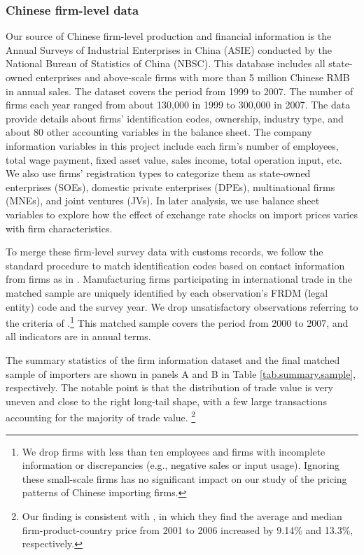 \subsubsection{Chinese firm-level data} \label{Data-CIE}

Our source of Chinese firm-level production and financial information is the Annual Surveys of Industrial Enterprises in China (ASIE) conducted by the National Bureau of Statistics of China (NBSC). This database includes all state-owned enterprises and above-scale firms with more than 5 million Chinese RMB in annual sales. The dataset covers the period from 1999 to 2007. The number of firms each year ranged from about 130,000 in 1999 to 300,000 in 2007. The data provide details about firms’ identification codes, ownership, industry type, and about 80 other accounting variables in the balance sheet. The company information variables in this project include each firm's number of employees, total wage payment, fixed asset value, sales income, total operation input, etc. We also use firms’ registration types to categorize them as state-owned enterprises (SOEs), domestic private enterprises (DPEs), multinational firms (MNEs), and joint ventures (JVs). In later analysis, we use balance sheet variables to explore how the effect of exchange rate shocks on import prices varies with firm characteristics.

To merge these firm-level survey data with customs records, we follow the standard procedure to match identification codes based on contact information from firms as in \cite{fan-li-yeaple2015}. Manufacturing firms participating in international trade in the matched sample are uniquely identified by each observation's FRDM (legal entity) code and the survey year. We drop unsatisfactory observations referring to the criteria of \cite{bkl2021}.\footnote{We drop firms with less than ten employees and firms with incomplete information or discrepancies (e.g., negative sales or input usage). Ignoring these small-scale firms has no significant impact on our study of the pricing patterns of Chinese importing firms.} This matched sample covers the period from 2000 to 2007, and all indicators are in annual terms.

The summary statistics of the firm information dataset and the final matched sample of importers are shown in panels A and B in Table \ref{tab.summary.sample}, respectively. The notable point is that the distribution of trade value is very uneven and close to the right long-tail shape, with a few large transactions accounting for the majority of trade value. \footnote{Our finding is consistent with \cite{fan-li-yeaple2015}, in which they find the average and median firm-product-country price from 2001 to 2006 increased by 9.14\% and 13.3\%, respectively.}

